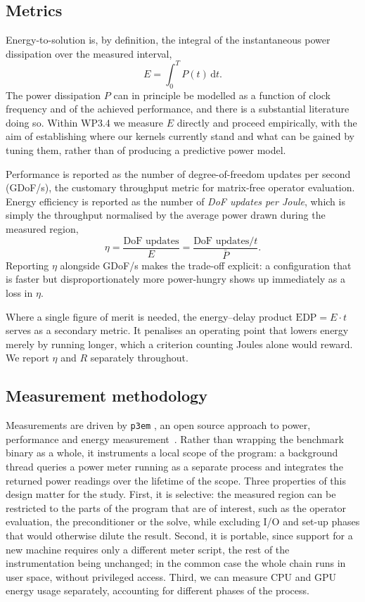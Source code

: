 \subsection{Metrics}

Energy-to-solution is, by definition, the integral of the instantaneous power dissipation over the measured interval,
%
\begin{equation}
  E = \int_{0}^{T} P(t)\,\mathrm{d}t .
\end{equation}
%
The power dissipation $P$ can in principle be modelled as a function of clock frequency and of the achieved performance, and there is a substantial literature doing so.
Within WP3.4 we measure $E$ directly and proceed empirically, with the aim of establishing where our kernels currently stand and what can be gained by tuning them, rather than of producing a predictive power model.

Performance is reported as the number of degree-of-freedom updates per second (GDoF/s), the customary throughput metric for matrix-free operator evaluation.
Energy efficiency is reported as the number of \emph{DoF updates per Joule}, which is simply the throughput normalised by the average power drawn during the measured region,
%
\begin{equation}
  \eta = \frac{\text{DoF updates}}{E} = \frac{\text{DoF updates}/t}{\bar{P}} .
\end{equation}
%
Reporting $\eta$ alongside GDoF/s makes the trade-off explicit: a configuration that is faster but disproportionately more power-hungry shows up immediately as a loss in $\eta$.

Where a single figure of merit is needed, the energy--delay product $\mathrm{EDP} = E \cdot t$ serves as a secondary metric.
It penalises an operating point that lowers energy merely by running longer, which a criterion counting Joules alone would reward.
We report $\eta$ and $R$ separately throughout.

\subsection{Measurement methodology}

Measurements are driven by \texttt{p3em} \citep{Cielo25}, an open source approach to power, performance and energy measurement~\citep{pribec_wccm2026}.
Rather than wrapping the benchmark binary as a whole, it instruments a local scope of the program: a background thread queries a power meter running as a separate process and integrates the returned power readings over the lifetime of the scope.
Three properties of this design matter for the study.
First, it is selective: the measured region can be restricted to the parts of the program that are of interest, such as the operator evaluation, the preconditioner or the solve, while excluding I/O and set-up phases that would otherwise dilute the result.
Second, it is portable, since support for a new machine requires only a different meter script, the rest of the instrumentation being unchanged; in the common case the whole chain runs in user space, without privileged access.
Third, we can measure CPU and GPU energy usage separately, accounting for different phases of the process.

